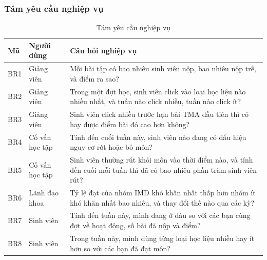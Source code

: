 \subsubsection{Tám yêu cầu nghiệp vụ}
\begin{table}[htbp]
\centering
\small
\begin{tabularx}{\textwidth}{|l|l|X|}
\hline
\textbf{Mã} & \textbf{Người dùng} & \textbf{Câu hỏi nghiệp vụ} \\ \hline
BR1 & Giảng viên & Mỗi bài tập có bao nhiêu sinh viên nộp, bao nhiêu nộp trễ, và điểm ra sao? \\ \hline
BR2 & Giảng viên & Trong một đợt học, sinh viên click vào loại học liệu nào nhiều nhất, và tuần nào click nhiều, tuần nào click ít? \\ \hline
BR3 & Giảng viên & Sinh viên click nhiều trước hạn bài TMA đầu tiên thì có hay được điểm bài đó cao hơn không? \\ \hline
BR4 & Cố vấn học tập & Tính đến cuối tuần này, sinh viên nào đang có dấu hiệu nguy cơ rớt hoặc bỏ môn? \\ \hline
BR5 & Cố vấn học tập & Sinh viên thường rút khỏi môn vào thời điểm nào, và tính đến cuối mỗi tuần thì đã có bao nhiêu phần trăm sinh viên rút? \\ \hline
BR6 & Lãnh đạo khoa & Tỷ lệ đạt của nhóm IMD khó khăn nhất thấp hơn nhóm ít khó khăn nhất bao nhiêu, và thay đổi thế nào qua các kỳ? \\ \hline
BR7 & Sinh viên & Tính đến tuần này, mình đang ở đâu so với các bạn cùng đợt về hoạt động, số bài đã nộp và điểm? \\ \hline
BR8 & Sinh viên & Trong tuần này, mình dùng từng loại học liệu nhiều hay ít hơn so với các bạn đã đạt môn? \\ \hline
\end{tabularx}
\caption{Tám yêu cầu nghiệp vụ}
\label{tab:br}
\end{table}

